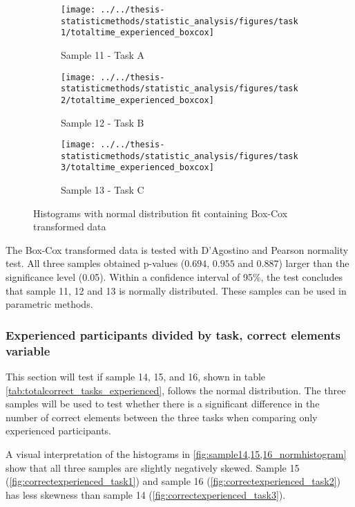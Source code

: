 \begin{figure}[H]
	\centering
	\begin{subfigure}[b]{0.32\textwidth}
		\centering
		\texttt{[image: ../../thesis-statisticmethods/statistic\_analysis/figures/task1/totaltime\_experienced\_boxcox]}
		\caption{Sample 11 - Task A}
		\label{fig:totaltimeexperiencedboxcox_task1}
	\end{subfigure}
	\begin{subfigure}[b]{0.32\textwidth}
		\centering
		\texttt{[image: ../../thesis-statisticmethods/statistic\_analysis/figures/task2/totaltime\_experienced\_boxcox]}
		\caption{Sample 12 - Task B}
		\label{fig:totaltimeexperiencedboxcox_task2}
	\end{subfigure}
	\begin{subfigure}[b]{0.32\textwidth}
		\centering
		\texttt{[image: ../../thesis-statisticmethods/statistic\_analysis/figures/task3/totaltime\_experienced\_boxcox]}
		\caption{Sample 13 - Task C}
		\label{fig:totaltimeexperiencedboxcox_task3}
	\end{subfigure}
	\caption{Histograms with normal distribution fit containing Box-Cox transformed data}
	\label{fig:sample11_12_13_boxcox_histogram}
\end{figure}

The Box-Cox transformed data is tested with D'Agostino and Pearson normality test. All three samples obtained p-values ($0.694$, $0.955$ and $0.887$) larger than the significance level (0.05). Within a confidence interval of 95\%, the test concludes that sample 11, 12 and 13 is normally distributed. These samples can be used in parametric methods.

\subsubsection[Sample 14, 15 and 16]{Experienced participants divided by task, correct elements variable}
This section will test if sample 14, 15, and 16, shown in table \ref{tab:totalcorrect_tasks_experienced}, follows the normal distribution. The three samples will be used to test whether there is a significant difference in the number of correct elements between the three tasks when comparing only experienced participants. 

A visual interpretation of the histograms in \ref{fig:sample14,15,16_normhistogram} show that all three samples are slightly negatively skewed. Sample 15 (\ref{fig:correctexperienced_task1}) and sample 16 (\ref{fig:correctexperienced_task2}) has less skewness than sample 14 (\ref{fig:correctexperienced_task3}).   

